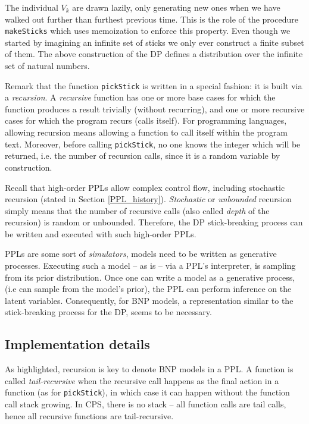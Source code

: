 The individual $V_k$ are drawn lazily, only generating new ones when we have walked out further than furthest previous time. This is the role of the procedure \texttt{makeSticks} which uses memoization to enforce this property. Even though we started by imagining an infinite set of sticks we only ever construct a finite subset of them. The above construction of the \gls{DP} defines a distribution over the infinite set of natural numbers.

Remark that the function \texttt{pickStick} is written in a special fashion: it is built via a \textit{recursion}. A \textit{recursive} function has one or more base cases for which the function produces a result trivially (without recurring), and one or more recursive cases for which the program recurs (calls itself). For programming languages, allowing recursion means allowing a function to call itself within the program text. Moreover, before calling \texttt{pickStick}, no one knows the integer which will be returned, i.e. the number of recursion calls, since it is a random variable by construction.

Recall that high-order \glspl{PPL} allow complex control flow, including stochastic recursion (stated in Section \ref{PPL_history}). \textit{Stochastic} or \textit{unbounded} recursion simply means that the number of recursive calls (also called \textit{depth} of the recursion) is random or unbounded. Therefore, the \gls{DP} stick-breaking process can be written and executed with such high-order \glspl{PPL}.

\glspl{PPL} are some sort of \textit{simulators}, models need to be written as generative processes. Executing such a model -- as is -- via a \gls{PPL}'s interpreter, is sampling from its prior distribution. Once one can write a model as a generative process, (i.e can sample from the model's prior), the \gls{PPL} can perform inference on the latent variables. Consequently, for \gls{BNP} models, a representation similar to the stick-breaking process for the \gls{DP}, seems to be necessary.


\subsection{Implementation details}
As highlighted, recursion is key to denote \gls{BNP} models in a \gls{PPL}.
A function is called \textit{tail-recursive} when the recursive call happens as the final action in a function (as for \texttt{pickStick}), in which case it can happen without the function call stack growing. In \gls{CPS}, there is no stack -- all function calls are tail calls, hence all recursive functions are tail-recursive.

